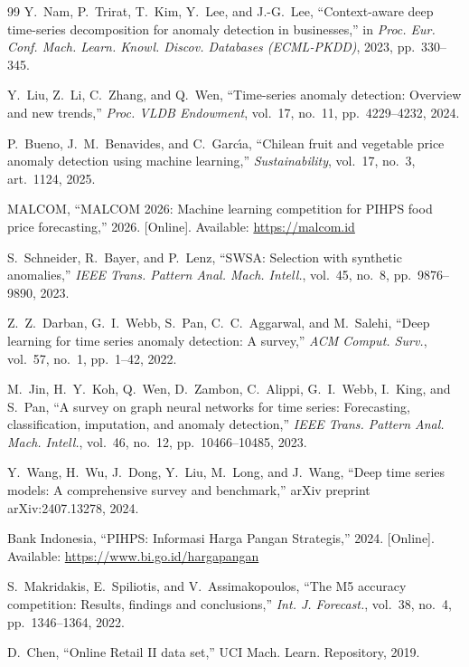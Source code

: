 \documentclass[10pt]{article}
\begin{document}
\begin{thebibliography}{99}
Y.~Nam, P.~Trirat, T.~Kim, Y.~Lee, and J.-G.~Lee, ``Context-aware deep time-series decomposition for anomaly detection in businesses,'' in \textit{Proc. Eur. Conf. Mach. Learn. Knowl. Discov. Databases (ECML-PKDD)}, 2023, pp.~330--345.

Y.~Liu, Z.~Li, C.~Zhang, and Q.~Wen, ``Time-series anomaly detection: Overview and new trends,'' \textit{Proc. VLDB Endowment}, vol.~17, no.~11, pp.~4229--4232, 2024.

P.~Bueno, J.~M.~Benavides, and C.~Garc\'{\i}a, ``Chilean fruit and vegetable price anomaly detection using machine learning,'' \textit{Sustainability}, vol.~17, no.~3, art.~1124, 2025.

MALCOM, ``MALCOM 2026: Machine learning competition for PIHPS food price forecasting,'' 2026. [Online]. Available: \url{https://malcom.id}

S.~Schneider, R.~Bayer, and P.~Lenz, ``SWSA: Selection with synthetic anomalies,'' \textit{IEEE Trans. Pattern Anal. Mach. Intell.}, vol.~45, no.~8, pp.~9876--9890, 2023.

Z.~Z.~Darban, G.~I.~Webb, S.~Pan, C.~C.~Aggarwal, and M.~Salehi, ``Deep learning for time series anomaly detection: A survey,'' \textit{ACM Comput. Surv.}, vol.~57, no.~1, pp.~1--42, 2022.

M.~Jin, H.~Y.~Koh, Q.~Wen, D.~Zambon, C.~Alippi, G.~I.~Webb, I.~King, and S.~Pan, ``A survey on graph neural networks for time series: Forecasting, classification, imputation, and anomaly detection,'' \textit{IEEE Trans. Pattern Anal. Mach. Intell.}, vol.~46, no.~12, pp.~10466--10485, 2023.

Y.~Wang, H.~Wu, J.~Dong, Y.~Liu, M.~Long, and J.~Wang, ``Deep time series models: A comprehensive survey and benchmark,'' arXiv preprint arXiv:2407.13278, 2024.

Bank Indonesia, ``PIHPS: Informasi Harga Pangan Strategis,'' 2024. [Online]. Available: \url{https://www.bi.go.id/hargapangan}

S.~Makridakis, E.~Spiliotis, and V.~Assimakopoulos, ``The M5 accuracy competition: Results, findings and conclusions,'' \textit{Int. J. Forecast.}, vol.~38, no.~4, pp.~1346--1364, 2022.

D.~Chen, ``Online Retail II data set,'' UCI Mach. Learn. Repository, 2019.


\end{thebibliography}
\end{document}
